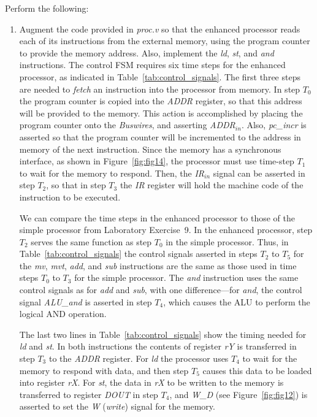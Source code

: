 \documentclass[epsfig,10pt,fullpage]{article} \addtolength{\textwidth}{1.5in}
\begin{document}
\newpage
\noindent
Perform the following:
\begin{enumerate}
\item Augment the code provided in {\it proc.v} so that the enhanced processor reads each
of its instructions from the external memory, using the program counter to provide the
memory address. Also, implement the {\it ld}, {\it st}, and {\it and} instructions. The
control FSM requires six time steps for the enhanced processor, as indicated in 
Table~\ref{tab:control_signals}.  The first three steps are needed to {\it fetch} 
an instruction into the processor from memory. In step $T_0$ 
the program counter is copied into the {\it ADDR} register, so that this
address will be provided to the memory. This action is accomplished by placing the program
counter onto the {\it Buswires}, and asserting {\it ADDR}$_{in}$. Also, 
{\it pc\_incr} is asserted so that the program counter will be incremented
to the address in memory of the next instruction. Since the memory has a synchronous
interface, as shown in Figure~\ref{fig:fig14}, the processor must use time-step $T_1$ to 
wait for the memory to respond. Then, the {\it IR$_{in}$} signal can be asserted in step
$T_2$, so that in step $T_3$ the {\it IR} register will hold the machine code of the
instruction to be executed. 

We can compare the time steps in the enhanced processor to those of the simple processor from
Laboratory Exercise~9. In the enhanced processor, step $T_2$ serves the same function as 
step $T_0$ in the simple processor. Thus, in Table~\ref{tab:control_signals} the control signals
asserted in steps $T_2$ to $T_5$ for the {\it mv}, {\it mvt}, {\it add}, and {\it sub} 
instructions are the same as those used in time steps $T_0$ to $T_3$ for the simple processor. 
The {\it and} instruction uses the same control signals as for {\it add} and {\it sub},
with one difference---for {\it and}, the control signal {\it ALU\_and} is asserted in 
step $T_4$, which causes the ALU to perform the logical AND operation.

The last two lines in Table~\ref{tab:control_signals} show the timing needed for {\it ld}
and {\it st}. In both instructions the contents of register {\it rY} is
transferred in step $T_3$ to the {\it ADDR} register. For {\it ld} the processor uses 
$T_4$ to wait for the memory to respond with data, and then step
$T_5$ causes this data to
be loaded into register {\it rX}. For {\it st}, the data in
{\it rX} to be written to the
memory is transferred to register {\it DOUT} in step $T_4$, and {\it W\_D} (see 
Figure~\ref{fig:fig12}) is asserted to set the {\it W} ({\it write}) signal for the memory.  


\end{enumerate}
\end{document}
